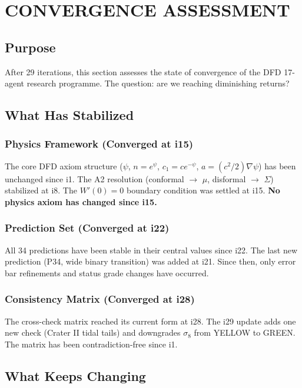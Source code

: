 \documentclass[11pt,a4paper]{article}
\begin{document}
\section{CONVERGENCE ASSESSMENT}

\subsection{Purpose}
After 29 iterations, this section assesses the state of convergence of the DFD 17-agent research programme. The question: are we reaching diminishing returns?

\subsection{What Has Stabilized}

\subsubsection{Physics Framework (Converged at i15)}
The core DFD axiom structure ($\psi$, $n = e^\psi$, $c_1 = c e^{-\psi}$, $a = (c^2/2)\nabla\psi$) has been unchanged since i1. The A2 resolution (conformal $\to$ $\mu$, disformal $\to$ $\Sigma$) stabilized at i8. The $W'(0) = 0$ boundary condition was settled at i15. \textbf{No physics axiom has changed since i15.}

\subsubsection{Prediction Set (Converged at i22)}
All 34 predictions have been stable in their central values since i22. The last new prediction (P34, wide binary transition) was added at i21. Since then, only error bar refinements and status grade changes have occurred.

\subsubsection{Consistency Matrix (Converged at i28)}
The cross-check matrix reached its current form at i28. The i29 update adds one new check (Crater II tidal tails) and downgrades $\sigma_8$ from YELLOW to GREEN. The matrix has been contradiction-free since i1.

\subsection{What Keeps Changing}
\end{document}
